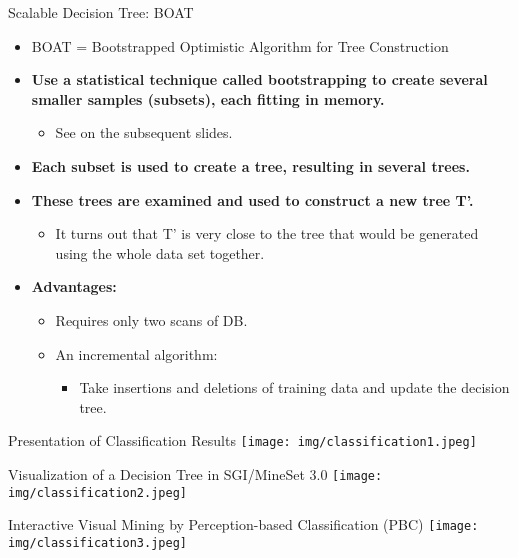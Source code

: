 \begin{frame}{Scalable Decision Tree: BOAT}
	\begin{itemize}
		\item BOAT = Bootstrapped Optimistic Algorithm for Tree Construction
		\item \textbf{Use a statistical technique called bootstrapping to create several smaller samples (subsets), each fitting in memory.}
		      \begin{itemize}
			      \item See on the subsequent slides.
		      \end{itemize}
		\item \textbf{Each subset is used to create a tree, resulting in several trees.}
		\item \textbf{These trees are examined and used to construct a new tree T'.}
		      \begin{itemize}
			      \item It turns out that T' is very close to the tree that would be generated \\
			            using the whole data set together.
		      \end{itemize}
		\item \textbf{Advantages:}
		      \begin{itemize}
			      \item Requires only two scans of DB.
			      \item An incremental algorithm:
			            \begin{itemize}
				            \item Take insertions and deletions of training data and update the decision tree.
			            \end{itemize}
		      \end{itemize}
	\end{itemize}
\end{frame}

\begin{frame}{Presentation of Classification Results}
	\centering
	\texttt{[image: img/classification1.jpeg]}
\end{frame}

\begin{frame}{Visualization of a Decision Tree in SGI/MineSet 3.0}
	\centering
	\texttt{[image: img/classification2.jpeg]}
\end{frame}

\begin{frame}{Interactive Visual Mining by Perception-based Classification (PBC)}
	\centering
	\texttt{[image: img/classification3.jpeg]}
\end{frame}
